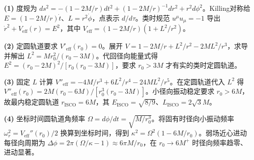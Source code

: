 \par\noindent\textbf{(1)} 度规为 \(ds^2=-(1-2M/r)dt^2+(1-2M/r)^{-1}dr^2+r^2d\phi^2\)。Killing对称给 \(E=(1-2M/r)\dot t\)、\(L=r^2\dot\phi\)，点表示 \(d/d\tau\)。类时规范 \(u^\mu u_\mu=-1\) 导出 \(\dot r^2+V_{\mathrm{eff}}(r)=E^2\)，其中 \(V_{\mathrm{eff}}=(1-2M/r)(1+L^2/r^2)\)。
\par\noindent\textbf{(2)} 定圆轨道要求 \(V'_{\mathrm{eff}}(r_0)=0\)。展开 \(V=1-2M/r+L^2/r^2-2ML^2/r^3\)，求导并解出 \(L^2=Mr_0^2/(r_0-3M)\)。代回径向能量式得 \(E^2=(r_0-2M)^2/[r_0(r_0-3M)]\)，要求 \(r_0>3M\) 才有实的类时定圆轨道。
\par\noindent\textbf{(3)} 固定 \(L\) 计算 \(V''_{\mathrm{eff}}=-4M/r^3+6L^2/r^4-24ML^2/r^5\)。在定圆轨道代入 \(L^2\) 得 \(V''_{\mathrm{eff}}(r_0)=2M(r_0-6M)/[r_0^3(r_0-3M)]\)。小径向振动稳定要求 \(r_0>6M\)，故最内稳定圆轨道 \(r_{\mathrm{ISCO}}=6M\)，其 \(E_{\mathrm{ISCO}}=\sqrt{8/9}\)、\(L_{\mathrm{ISCO}}=2\sqrt3M\)。
\par\noindent\textbf{(4)} 坐标时间圆轨道角频率 \(\Omega=d\phi/dt=\sqrt{M/r_0^3}\)。将固有时径向小振动频率 \(\omega_r^2=V_{\mathrm{eff}}''(r_0)/2\) 换算到坐标时间，得到 \(\kappa^2=\Omega^2(1-6M/r_0)\)。弱场近心进动每径向周期为 \(\Delta\phi=2\pi(\Omega/\kappa-1)\approx6\pi M/r_0\)，在 \(r_0\to6M^+\) 时径向频率趋零、进动显著。
